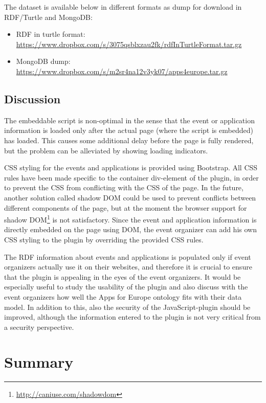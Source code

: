 The dataset is available below in different formats as dump for download in RDF/Turtle and MongoDB:

\begin{itemize}
\item RDF in turtle format: \url{https://www.dropbox.com/s/3075qsblxzau2fk/rdfInTurtleFormat.tar.gz} 
\item MongoDB dump: \url{https://www.dropbox.com/s/m2sr4na12v3yk07/apps4europe.tar.gz} 
\end{itemize}

\subsection{Discussion}
The embeddable script is non-optimal in the sense that the event or application information is loaded only after the actual page (where the script is embedded) has loaded. This causes some additional delay before the page is fully rendered, but the problem can be alleviated by showing loading indicators.

CSS styling for the events and applications is provided using Bootstrap. All CSS rules have been made specific to the container div-element of the plugin, in order to prevent the CSS from conflicting with the CSS of the page. In the future, another solution called shadow DOM could be used to prevent conflicts between different components of the page, but at the moment the browser support for shadow DOM\footnote{\url{http://caniuse.com/shadowdom}} is not satisfactory. Since the event and application information is directly embedded on the page using DOM, the event organizer can add his own CSS styling to the plugin by overriding the provided CSS rules.

The RDF information about events and applications is populated only if event organizers actually use it on their websites, and therefore it is crucial to ensure that the plugin is appealing in the eyes of the event organizers. It would be especially useful to study the usability of the plugin and also discuss with the event organizers how well the Apps for Europe ontology fits with their data model. In addition to this, also the security of the JavaScript-plugin should be improved, although the information entered to the plugin is not very critical from a security perspective.

\section{Summary}
\label{sec:summarych5}

